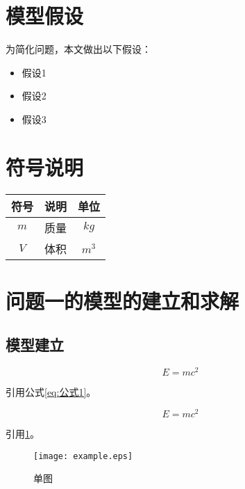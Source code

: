 \documentclass[withoutpreface,bwprint]{cumcmthesis}
\begin{document}

\section{模型假设}

为简化问题，本文做出以下假设：

\begin{itemize}[itemindent=2em]
\item 假设1
\item 假设2
\item 假设3
\end{itemize}


\section{符号说明}
\begin{table}[H]
\centering
\begin{tabularx}{\textwidth}{CLC}
\toprule
符号    & 说明    & 单位 \\
\midrule
$m     $& 质量 & $kg$ \\
$V     $& 体积 & $m^3$ \\
\bottomrule
\end{tabularx}
\label{tab:符号说明}
\end{table}



\section{问题一的模型的建立和求解}
\subsection{模型建立}

$$
E = mc^2
$$

引用公式\cref{eq:公式1}。

\begin{equation}
\label{eq:公式1}
E = mc^2
\end{equation}

引用\cref{fig:单图}。

\begin{figure}[ht]
\centering
\texttt{[image: example.eps]}
\caption{单图}
\label{fig:单图}
\end{figure}
\end{document}

